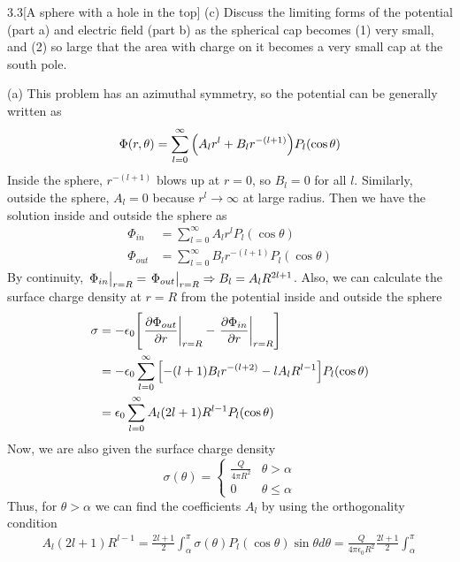 \documentclass[12pt]{article}
\begin{document}
\begin{problem}{3.3}[A sphere with a hole in the top]
(c) Discuss the limiting forms of the potential (part a) and electric field
(part b) as the spherical cap becomes (1) very small, and (2) so large that the
area with charge on it becomes a very small cap at the south pole.
\begin{solution}
(a) This problem has an azimuthal symmetry, so the potential can be generally
written as
\begin{equation}
    \Phi(r,\theta)=\sum_{l=0}^\infty\qty(A_lr^l+B_lr^{-(l+1)})P_l(\cos\theta) 
\end{equation}
Inside the sphere, $r^{-(l+1)}$ blows up at $r=0$, so $B_l=0$ for all $l$.
Similarly, outside the sphere, $A_l=0$ because $r^l\to\infty$ at large radius.
Then we have the solution inside and outside the sphere as
\begin{subequations}
    \begin{align}
        \Phi_{in}&=\sum_{l=0}^\infty A_lr^lP_l(\cos\theta) \\
        \Phi_{out}&=\sum_{l=0}^\infty B_lr^{-(l+1)}P_l(\cos\theta) 
    \end{align}
\end{subequations}
By continuity, $\eval{\Phi_{in}}_{r=R}=\eval{\Phi_{out}}_{r=R}\Rightarrow
B_l=A_lR^{2l+1}$. Also, we can calculate the surface charge density at $r=R$
from the potential inside and outside the sphere
\begin{align}
    \sigma&=-\epsilon_0\qty[
        \eval{\frac{\partial\Phi_{out}}{\partial r}}_{r=R}
        -\eval{\frac{\partial\Phi_{in}}{\partial r}}_{r=R}
    ]\notag\\
    &=-\epsilon_0\sum_{l=0}^\infty
        \qty[-(l+1)B_lr^{-(l+2)}-lA_lR^{l-1}]P_l(\cos\theta)\notag\\
    &=\epsilon_0\sum_{l=0}^\infty A_l(2l+1)R^{l-1}P_l(\cos\theta)
\end{align}
Now, we are also given the surface charge density
\begin{equation}
    \sigma(\theta)=\begin{cases}
        \frac{Q}{4\pi R^2} & \theta>\alpha\\
        0 & \theta\leq\alpha
    \end{cases}
\end{equation}
Thus, for $\theta>\alpha$ we can find the coefficients $A_l$ by using the
orthogonality condition
\begin{align}
    A_l(2l+1)R^{l-1}=\frac{2l+1}{2}\int_{\alpha}^\pi
    \sigma(\theta)P_l(\cos\theta)\sin\theta d\theta 
    =\frac{Q}{4\pi\epsilon_0 R^2}\frac{2l+1}{2}\int_{\alpha}^\pi

\end{align}
\end{solution}
\end{problem}
\end{document}
